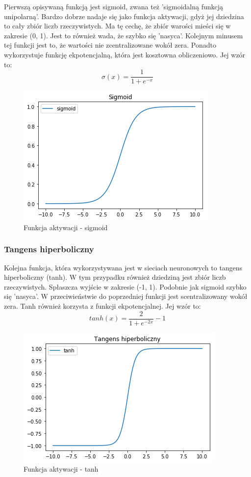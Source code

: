 \documentclass{report}
\begin{document}
    Pierwszą opisywaną funkcją jest sigmoid, zwana też 'sigmoidalną funkcją unipolarną'.
    Bardzo dobrze nadaje się jako funkcja aktywacji, gdyż jej dziedzina to cały zbiór liczb rzeczywistych.
    Ma tę cechę, że zbiór warości mieści się w zakresie (0, 1).
    Jest to również wada, że szybko się 'nasyca'.
    Kolejnym minusem tej funkcji jest to, że wartości nie zcentralizowane wokół zera.
    Ponadto wykorzystuje funkcję ekpotencjalną, która jest kosztowna obliczeniowo.
    Jej wzór to:
    $$
    \sigma(x) = \frac {1}{1+e^{-x}}
    $$

    \begin{figure}[h!]
        \centering
        \includegraphics[scale=0.7]{./img/sigmoid.png}
        \caption{Funkcja aktywacji - sigmoid}
    \end{figure}

    \subsubsection{Tangens hiperboliczny}
    Kolejna funkcja, która wykorzystywana jest w sieciach neuronowych to tangens hiperboliczny (tanh).
    W tym przypadku również dziedziną jest zbiór liczb rzeczywistych.
    Spłaszcza wyjście w zakresie (-1, 1).
    Podobnie jak sigmoid szybko się 'nasyca'.
    W przeciwieństwie do poprzedniej funkcji jest scentralizowany wokół zera.
    Tanh również korzysta z funkcji ekpotencjalnej.
    Jej wzór to:
    $$
    tanh(x) = \frac {2}{1+e^{-2x}} - 1
    $$

    \begin{figure}[h!]
        \centering
        \includegraphics[scale=0.7]{./img/tanh.png}
        \caption{Funkcja aktywacji - tanh}
    \end{figure}
\end{document}
